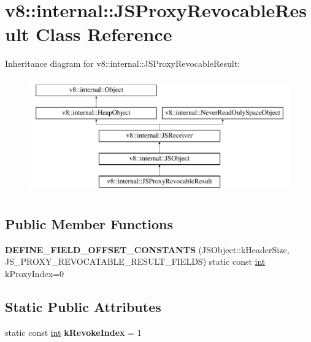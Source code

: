 \hypertarget{classv8_1_1internal_1_1JSProxyRevocableResult}{}\section{v8\+:\+:internal\+:\+:J\+S\+Proxy\+Revocable\+Result Class Reference}
\label{classv8_1_1internal_1_1JSProxyRevocableResult}
Inheritance diagram for v8\+:\+:internal\+:\+:J\+S\+Proxy\+Revocable\+Result\+:\begin{figure}[H]
\begin{center}
\leavevmode
\includegraphics[height=5.000000cm]{classv8_1_1internal_1_1JSProxyRevocableResult}
\end{center}
\end{figure}
\subsection*{Public Member Functions}
\begin{DoxyCompactItemize}
\item 
\mbox{\label{classv8_1_1internal_1_1JSProxyRevocableResult_a865fda727cde2139fdc467d1c5701b62}} 
{\bfseries D\+E\+F\+I\+N\+E\+\_\+\+F\+I\+E\+L\+D\+\_\+\+O\+F\+F\+S\+E\+T\+\_\+\+C\+O\+N\+S\+T\+A\+N\+TS} (J\+S\+Object\+::k\+Header\+Size, J\+S\+\_\+\+P\+R\+O\+X\+Y\+\_\+\+R\+E\+V\+O\+C\+A\+T\+A\+B\+L\+E\+\_\+\+R\+E\+S\+U\+L\+T\+\_\+\+F\+I\+E\+L\+DS) static const \mbox{\hyperlink{classint}{int}} k\+Proxy\+Index=0
\end{DoxyCompactItemize}
\subsection*{Static Public Attributes}
\begin{DoxyCompactItemize}
\item 
\mbox{\label{classv8_1_1internal_1_1JSProxyRevocableResult_a6e60187293f13d25d3df32444ec60d04}} 
static const \mbox{\hyperlink{classint}{int}} {\bfseries k\+Revoke\+Index} = 1
\end{DoxyCompactItemize}
